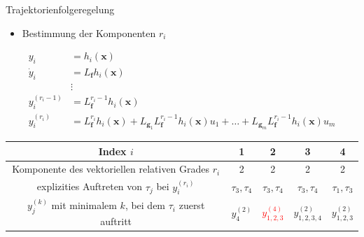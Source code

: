 \documentclass[
	ngerman,
	10pt,				%
	aspectratio=169 	%
]{beamer}
\begin{document}

\begin{frame}[t,fragile,label=trajektorienregelung_2]{\large Trajektorienfolgeregelung}

	\begin{itemize}
		\item Bestimmung der Komponenten $r_i$
	\end{itemize}
	\begin{align*}
	y_i &= h_i(\mathbf{x}) \\
	\dot{y}_i &= L_{\mathbf{f}} h_i(\mathbf{x}) \\
	&\vdots \\
	y_i^{(r_i - 1)} &= L_{\mathbf{f}}^{r_i - 1} h_i(\mathbf{x}) \\
	y_i^{(r_i)} &= L_{\mathbf{f}}^{r_i} h_i(\mathbf{x}) + L_{\mathbf{g}_1} L_{\mathbf{f}}^{r_i - 1} h_i(\mathbf{x}) u_1 + \hdots + L_{\mathbf{g}_m} L_{\mathbf{f}}^{r_i - 1} h_i(\mathbf{x}) u_m
	\end{align*}
	\pause

	\begin{table}[htbp]%
		\centering
		\label{tab:relative_degrees}
		\begin{tabular}{c| c c c c}
			\hline
			Index $i$ & 1 & 2 & 3 & 4 \\ 
			\hline
			Komponente des vektoriellen relativen Grades $r_i$ & 2 & 2 & 2 & 2\\ 
			\hline
			explizities Auftreten von $\tau_j$ bei $y_i^{(r_i)}$ & $\tau_3, \tau_4$ & $\tau_3, \tau_4$ & $\tau_3, \tau_4$ & $\tau_1, \tau_3$ \\
			\hline
			$y_j^{(k)}$ mit minimalem $k$, bei dem $\tau_i$ zuerst auftritt & $y_4^{(2)}$ & \textcolor{red}{$y_{1,2,3}^{(4)}$} & $y_{1,2,3,4}^{(2)}$ & $y_{1,2,3}^{(2)}$\\
			\hline
		\end{tabular}
	\end{table}
	
\end{frame}

\end{document}
